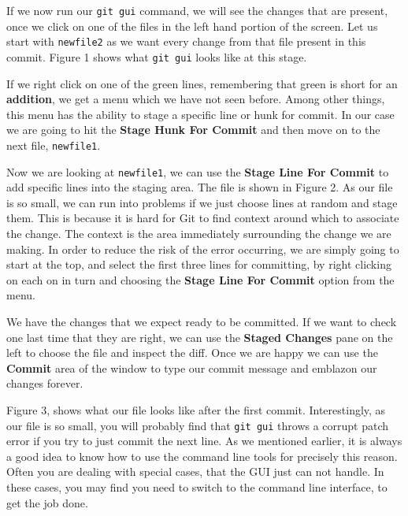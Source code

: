 If we now run our \texttt{git gui} command, we will see the changes that are present, once we click on one of the files in the left hand portion of the screen.
Let us start with \texttt{newfile2} as we want every change from that file present in this commit.
Figure 1 shows what \texttt{git gui} looks like at this stage.


If we right click on one of the green lines, remembering that green is short for an \textbf{addition}, we get a menu which we have not seen before.
Among other things, this menu has the ability to stage a specific line or hunk for commit.
In our case we are going to hit the \textbf{Stage Hunk For Commit} and then move on to the next file, \texttt{newfile1}.


Now we are looking at \texttt{newfile1}, we can use the \textbf{Stage Line For Commit} to add specific lines into the staging area.
The file is shown in Figure 2.
As our file is so small, we can run into problems if we just choose lines at random and stage them.
This is because it is hard for Git to find context around which to associate the change.
The context is the area immediately surrounding the change we are making.
In order to reduce the risk of the error occurring, we are simply going to start at the top, and select the first three lines for committing, by right clicking on each on in turn and choosing the \textbf{Stage Line For Commit} option from the menu.

We have the changes that we expect ready to be committed.
If we want to check one last time that they are right, we can use the \textbf{Staged Changes} pane on the left to choose the file and inspect the diff.
Once we are happy we can use the \textbf{Commit} area of the window to type our commit message and emblazon our changes forever.


Figure 3, shows what our file looks like after the first commit.
Interestingly, as our file is so small, you will probably find that \texttt{git gui} throws a corrupt patch error if you try to just commit the next line.
As we mentioned earlier, it is always a good idea to know how to use the command line tools for precisely this reason.
Often you are dealing with special cases, that the GUI just can not handle.
In these cases, you may find you need to switch to the command line interface, to get the job done.

